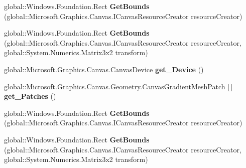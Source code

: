 \begin{DoxyCompactItemize}
\mbox{\label{interface_microsoft_1_1_graphics_1_1_canvas_1_1_geometry_1_1_i_canvas_gradient_mesh_a60495941d0df177b0c3211c88f21395d}} 
global\+::\+Windows.\+Foundation.\+Rect {\bfseries Get\+Bounds} (global\+::\+Microsoft.\+Graphics.\+Canvas.\+I\+Canvas\+Resource\+Creator resource\+Creator)
\item 
\mbox{\label{interface_microsoft_1_1_graphics_1_1_canvas_1_1_geometry_1_1_i_canvas_gradient_mesh_af752134439dc779ececd8c807383c753}} 
global\+::\+Windows.\+Foundation.\+Rect {\bfseries Get\+Bounds} (global\+::\+Microsoft.\+Graphics.\+Canvas.\+I\+Canvas\+Resource\+Creator resource\+Creator, global\+::\+System.\+Numerics.\+Matrix3x2 transform)
\item 
\mbox{\label{interface_microsoft_1_1_graphics_1_1_canvas_1_1_geometry_1_1_i_canvas_gradient_mesh_a68a310ad09ab7904bbc54422f689cf20}} 
global\+::\+Microsoft.\+Graphics.\+Canvas.\+Canvas\+Device {\bfseries get\+\_\+\+Device} ()
\item 
\mbox{\label{interface_microsoft_1_1_graphics_1_1_canvas_1_1_geometry_1_1_i_canvas_gradient_mesh_a0c0aede79e9bd4a377b1c963cc2ebdc2}} 
global\+::\+Microsoft.\+Graphics.\+Canvas.\+Geometry.\+Canvas\+Gradient\+Mesh\+Patch \mbox{[}$\,$\mbox{]} {\bfseries get\+\_\+\+Patches} ()
\item 
\mbox{\label{interface_microsoft_1_1_graphics_1_1_canvas_1_1_geometry_1_1_i_canvas_gradient_mesh_a60495941d0df177b0c3211c88f21395d}} 
global\+::\+Windows.\+Foundation.\+Rect {\bfseries Get\+Bounds} (global\+::\+Microsoft.\+Graphics.\+Canvas.\+I\+Canvas\+Resource\+Creator resource\+Creator)
\item 
\mbox{\label{interface_microsoft_1_1_graphics_1_1_canvas_1_1_geometry_1_1_i_canvas_gradient_mesh_af752134439dc779ececd8c807383c753}} 
global\+::\+Windows.\+Foundation.\+Rect {\bfseries Get\+Bounds} (global\+::\+Microsoft.\+Graphics.\+Canvas.\+I\+Canvas\+Resource\+Creator resource\+Creator, global\+::\+System.\+Numerics.\+Matrix3x2 transform)

\end{DoxyCompactItemize}
